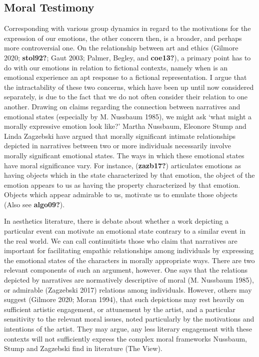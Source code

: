 \documentclass[12pt]{book}
\theoremstyle{definition}
\theoremstyle{remark}
\begin{document}
\subsection*{Moral Testimony}\label{moral-testimony-1}

Corresponding with various group dynamics in regard to the motivations for the expression of our emotions, the other concern then, is a broader, and perhaps more controversial one. On the relationship between art and ethics (Gilmore 2020; \textbf{stol92?}; Gaut 2003; Palmer, Begley, and \textbf{coe13?}), a primary point has to do with our emotions in relation to fictional contexts, namely when is an emotional experience an apt response to a fictional representation. I argue that the intractability of these two concerns, which have been up until now considered separately, is due to the fact that we do not often consider their relation to one another. Drawing on claims regarding the connection between narratives and emotional states (especially by M. Nussbaum 1985), we might ask `what might a morally expressive emotion look like?' Martha Nussbaum, Eleonore Stump and Linda Zagzebski have argued that morally significant intimate relationships depicted in narratives between two or more individuals necessarily involve morally significant emotional states. The ways in which these emotional states have moral significance vary. For instance, (\textbf{zazb17?}) articulates emotions as having objects which in the state characterized by that emotion, the object of the emotion appears to us as having the property characterized by that emotion. Objects which appear admirable to us, motivate us to emulate those objects (Also see \textbf{algo09?}).

In aesthetics literature, there is debate about whether a work depicting a particular event can motivate an emotional state contrary to a similar event in the real world. We can call continuitists those who claim that narratives are important for facilitating empathic relationships among individuals by expressing the emotional states of the characters in morally appropriate ways. There are two relevant components of such an argument, however. One says that the relations depicted by narratives are normatively descriptive of moral (M. Nussbaum 1985), or admirable (Zagzebski 2017) relations among individuals. However, others may suggest (Gilmore 2020; Moran 1994), that such depictions may rest heavily on sufficient artistic engagement, or attunement by the artist, and a particular sensitivity to the relevant moral issues, noted particularly by the motivations and intentions of the artist. They may argue, any less literary engagement with these contexts will not sufficiently express the complex moral frameworks Nussbaum, Stump and Zagzebski find in literature (The View).
\end{document}
